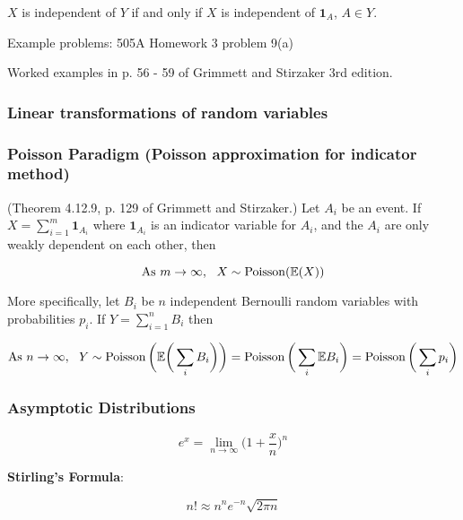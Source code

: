 \begin{theorem} \(X\) is independent of \(Y\) if and only if \(X\) is independent of \(\boldsymbol{1}_A\), \(A \in Y\). \end{theorem}

Example problems: 505A Homework 3 problem 9(a)

Worked examples in p. 56 - 59 of Grimmett and Stirzaker 3rd edition.

\subsubsection{Linear transformations of random variables}

\subsubsection{Poisson Paradigm (Poisson approximation for indicator method)}

\begin{theorem} (Theorem 4.12.9, p. 129 of Grimmett and Stirzaker.) Let \(A_i\) be an event. If \(X = \sum_{i=1}^m \boldsymbol{1}_{A_i}\) where \(\boldsymbol{1}_{A_i}\) is an indicator variable for \(A_i\), and the \(A_i\) are only weakly dependent on each other, then 

\[
\text{As } m \to \infty, \ \ X \sim \operatorname{Poisson}(\E(X))
\]

More specifically, let \(B_i\) be \(n\) independent Bernoulli random variables with probabilities \(p_i\). If \(Y = \sum_{i=1}^n B_i\) then 

\[
\text{As } n \to \infty, \ \ Y \sim \operatorname{Poisson} \bigg(\E \bigg(\sum_i B_i \bigg) \bigg) = \operatorname{Poisson}\bigg(\sum_i \E B_i \bigg) = \operatorname{Poisson}\bigg(\sum_i p_i \bigg) 
\]

\end{theorem}

\subsubsection{Asymptotic Distributions}

\begin{proposition}
\[
e^x = \lim_{n \to \infty} \bigg( 1 + \frac{x}{n}\bigg)^n
\]
\end{proposition}

\begin{theorem} \label{prob.stirling} \textbf{Stirling's Formula}: 

\[
n! \approx n^ne^{-n} \sqrt{2\pi n}
\]
\end{theorem}

